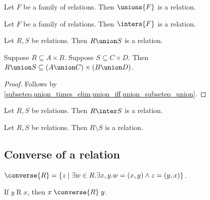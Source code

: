 \begin{proposition}\label{unions_of_family_of_relations_is_relation}
    Let $F$ be a family of relations.
    Then $\unions{F}$ is a relation.
\end{proposition}

\begin{proposition}\label{inters_of_family_of_relations_is_relation}
    Let $F$ be a family of relations.
    Then $\inters{F}$ is a relation.
\end{proposition}

\begin{proposition}\label{union_relations_is_relation}
    Let $R, S$ be relations.
    Then $R\union S$ is a relation.
\end{proposition}

\begin{proposition}\label{union_relations_is_relation_type}
    Suppose $R\subseteq A\times B$.
    Suppose $S\subseteq C\times D$.
    Then $R\union S\subseteq (A\union C)\times (B\union D)$.
\end{proposition}
\begin{proof}
    Follows by \cref{subseteq,union_times_elim,union_iff,union_subseteq_union}.
\end{proof}

\begin{proposition}\label{inter_relations_is_relation}
    Let $R, S$ be relations.
    Then $R\inter S$ is a relation.
\end{proposition}

\begin{proposition}\label{setminus_relations_is_relation}
    Let $R, S$ be relations.
    Then $R\setminus S$ is a relation.
\end{proposition}



\subsection{Converse of a relation}

\begin{definition}\label{converse_relation}
    $\converse{R} = \{ z\mid \exists w\in R. \exists x, y. w = (x, y)\land z = (y, x)\}$.
\end{definition}

\begin{proposition}\label{converse_intro}
    If $y\mathrel{R} x$, then $x\mathrel{\converse{R}} y$.
\end{proposition}

